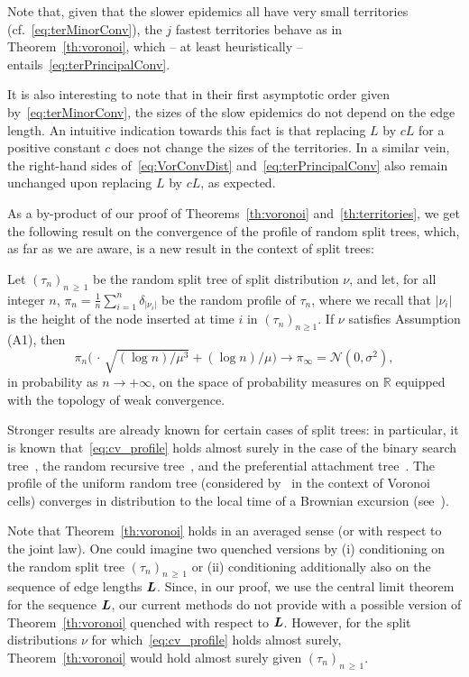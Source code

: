 \documentclass[AHL,Unicode,longabstracts,published]{cedram}
\newcommand{\bs}{\ensuremath{\boldsymbol}}
\newcommand{\bbR}{\mathbb{R}}
\newcommand{\clN}{\mathcal{N}}
\begin{document}
Note that, given that the slower epidemics all have very small territories (cf.~\eqref{eq:terMinorConv}), the $j$ fastest territories behave as in Theorem~\ref{th:voronoi}, which -- at least heuristically -- entails~\eqref{eq:terPrincipalConv}.

It is also interesting to note that in their first asymptotic order given by~\eqref{eq:terMinorConv}, the sizes of the slow epidemics do not depend on the edge length. An intuitive indication towards this fact is that replacing $L$ by $cL$ for a positive constant $c$ does not change the sizes of the territories. In a similar vein, the right-hand sides of~\eqref{eq:VorConvDist} and~\eqref{eq:terPrincipalConv} also remain unchanged upon replacing $L$ by $cL$, as expected.

As a by-product of our proof of Theorems~\ref{th:voronoi} and~\ref{th:territories}, we get the following result on the convergence of the profile of random split trees, which, as far as we are aware, is a new result in the context of split trees:

\begin{prop}\label{prop:profile}
Let $(\tau_n)_{n\,\geq\,1}$ be the random split tree of split distribution $\nu$, and let, for all integer $n$, $\pi_n = \frac1n\sum_{i=1}^n \delta_{|\nu_i|}$ be the random profile of $\tau_n$, where we recall that $|\nu_i|$ is the height of the node inserted at time $i$ in $(\tau_n)_{n\geq 1}$. If $\nu$ satisfies Assumption {\rm (A1)}, then
\begin{equation}\label{eq:cv_profile}
\pi_n\big(\,\cdot\,\sqrt{(\log n)/\mu^3}+ (\log n)/\mu\big) \to \pi_{\infty}=\clN(0,\sigma^2),
\end{equation}
in probability as $n\to+\infty$, on the space of probability measures on $\bbR$ equipped with the topology of weak convergence.
\end{prop}

Stronger results are already known for certain cases of split trees: in particular, it is known that~\eqref{eq:cv_profile} holds almost surely in the case of the binary search tree~\cite{CDJ01}, the random recursive tree~\cite{MM17}, and the preferential attachment tree~\cite{Katona05}. The profile of the uniform random tree (considered by~\cite{Chapuy} in the context of Voronoi cells) converges in distribution to the local time of a Brownian excursion (see~\cite{DG}).


\begin{rema}\label{rk:quenched_vs_annealed}
Note that Theorem~\ref{th:voronoi} holds in an averaged sense (or with respect to the joint law). One could imagine two quenched versions by (i) conditioning on the random split tree $(\tau_n)_{n\,\geq\,1}$ or (ii) conditioning additionally also on the sequence of edge lengths $\bs L$. Since, in our proof, we use the central limit theorem for the sequence $\bs L$, our current methods do not provide with a possible version of Theorem~\ref{th:voronoi} quenched with respect to $\bs L$. However, for the split distributions $\nu$ for which~\eqref{eq:cv_profile} holds almost surely, Theorem~\ref{th:voronoi} would hold almost surely given $(\tau_n)_{n\,\geq\,1}$.
\end{rema}
\end{document}
